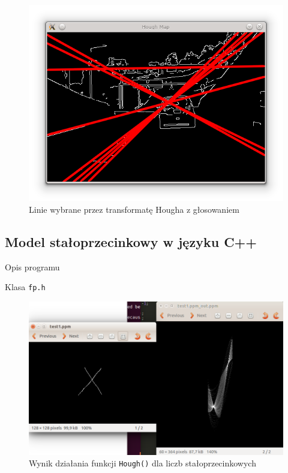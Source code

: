 \begin{figure}[!htb]
  \includegraphics[width=\linewidth]{img/hough_screen.png}
  \caption{Linie wybrane przez transformatę Hougha z głosowaniem}\label{fig:awesome_image3}
\endminipage
\end{figure}

\blindtext

%

\newpage
\subsection{Model stałoprzecinkowy w języku C++}

Opis programu

Klasa \texttt{fp.h}

\begin{figure}[!htb]
\centering
\includegraphics[scale=0.75]{img/fixed.png}
\caption{Wynik działania funkcji \texttt{Hough()} dla liczb stałoprzecinkowych}
\label{rys:fp}
\end{figure}

